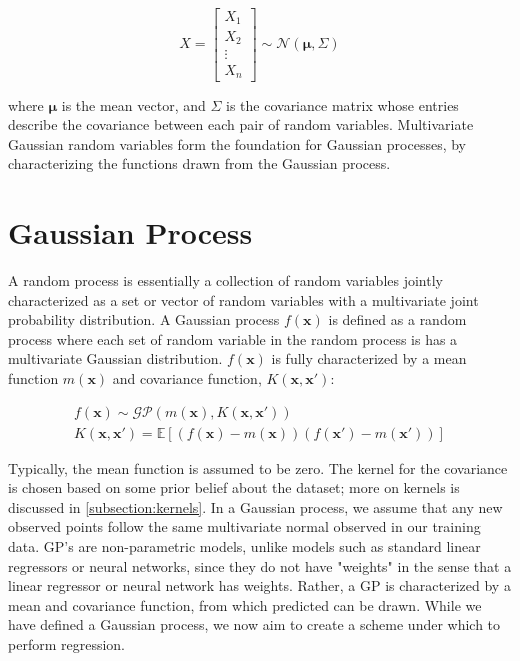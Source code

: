 \documentclass{article}
\newcommand{\E}{\mathbb{E}}
\newcommand{\bx}{\boldsymbol{x}}
\begin{document}
\[
  X = \begin{bmatrix}
           X_{1} \\
           X_{2} \\
           \vdots \\
           X_{n}
         \end{bmatrix}   \sim \mathcal{N}(\boldsymbol{\mu},\Sigma)
\]

where $\boldsymbol{\mu}$ is the mean vector, and $\Sigma$ is the covariance matrix whose entries describe the covariance
between each pair of random variables. Multivariate Gaussian random variables form the foundation for Gaussian
processes, by characterizing the functions drawn from the Gaussian process.

\section{Gaussian Process}

A random process is essentially a collection of random variables jointly characterized  as a set or vector of random
variables with a multivariate joint probability distribution. A Gaussian process $f(\boldsymbol{x})$ is defined as a
random process where each set of random variable in the random process is has a multivariate Gaussian distribution.
$f(\bx)$ is fully characterized by a mean function  $m(\bx)$ and covariance function,
$K(\bx,\bx')$:

\begin{gather*}
  f(\boldsymbol{x})\sim\mathcal{GP}(m(\bx),K(\bx, \bx')) \\
  K(\bx, \bx') = \E[(f(\bx) - m(\bx))(f(\bx') - m(\bx'))]
\end{gather*}

Typically, the mean function is assumed to be zero. The kernel for the covariance is chosen based on some prior belief
about the dataset; more on kernels is discussed in \ref{subsection:kernels}. In a Gaussian process, we assume that any
new observed points follow the same multivariate normal observed in our training data. GP's are non-parametric models,
unlike models such as standard linear regressors or neural networks, since they do not have "weights" in the sense that
a linear regressor or neural network has weights\cite{bishop_pattern_2006}. Rather, a GP is characterized by a mean and
covariance function, from which predicted can be drawn\cite{kuss_gaussian_2006}. While we have defined a Gaussian
process, we now aim to create a scheme under which to perform regression.
\end{document}
